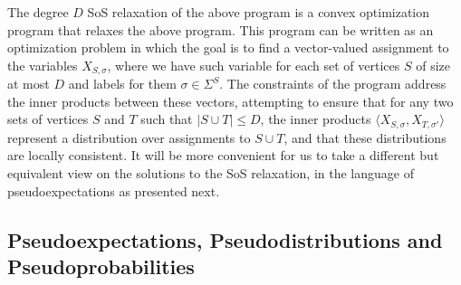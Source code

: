 \documentclass[11pt]{article}
\def \sos {SoS\xspace}
\theoremstyle{definition}
\begin{document}
The degree $D$ \sos relaxation of the above program is a convex 
optimization program that relaxes the above program. This 
program can be written as an optimization problem in which 
the goal is to find a vector-valued assignment to the variables $X_{S,\sigma}$, 
where we have such variable for each set of vertices $S$ of size at most $D$ and labels for them $\sigma\in \Sigma^S$. 
The constraints of the program address the inner products between these vectors, attempting to ensure that for any two sets 
of vertices $S$ and $T$ such that $|S\cup T|\leq D$, 
the inner products 
$\langle X_{S,\sigma}, X_{T,\sigma'}\rangle$ represent 
a distribution over assignments to $S\cup T$, and that 
these distributions are locally consistent. 
It will be more convenient for us to take a different 
but equivalent view on the solutions to the \sos relaxation,
in the language of pseudoexpectations as presented next.

\subsection{Pseudoexpectations, Pseudodistributions and Pseudoprobabilities}
\end{document}
